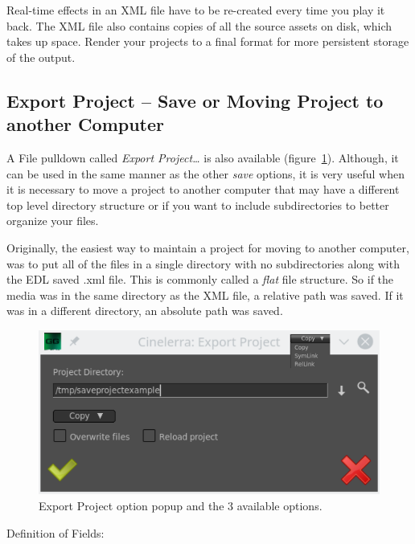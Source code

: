 Real-time effects in an XML file have to be re-created every time you play it back. The XML file also contains copies of all the source assets on disk, which takes up space.  Render your projects to a final format for more persistent storage of the output.

\subsection{Export Project – Save or Moving Project to another Computer}%
\label{sub:export_project}

A File pulldown called \textit{Export Project\dots} is also available (figure~\ref{fig:export}).  Although, it can be used in the same manner as the other \textit{save} options, it is very useful when it is necessary to move a project to another computer that may have a different top level directory structure or if you want to include subdirectories to better organize your files.  

Originally, the easiest way to maintain a project for moving to another computer, was to put all of the files in a single directory with no subdirectories along with the EDL saved .xml file.   This is commonly called a \textit{flat} file structure.  So if the media was in the same directory as the XML file, a relative path was saved.  If it was in a different directory, an absolute path was saved.

\begin{figure}[htpb]
    \centering
    \includegraphics[width=0.6\linewidth]{images/export.png}
    \caption{Export Project option popup and the 3         available options.}
    \label{fig:export}
\end{figure}

\noindent Definition of Fields:

